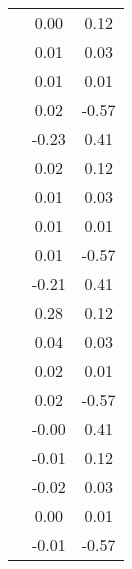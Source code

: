 \begin{table}
\begin{tabular}{c|cc|}
\multicolumn{1}{|c|}{} & \multicolumn{1}{|c|}{      0.00} & \multicolumn{1}{|c|}{      0.12} \\ 
\multicolumn{1}{|c|}{} & \multicolumn{1}{|c|}{      0.01} & \multicolumn{1}{|c|}{      0.03} \\ 
\multicolumn{1}{|c|}{} & \multicolumn{1}{|c|}{      0.01} & \multicolumn{1}{|c|}{      0.01} \\ 
\multicolumn{1}{|c|}{} & \multicolumn{1}{|c|}{      0.02} & \multicolumn{1}{|c|}{     -0.57} \\ 
\multicolumn{1}{|c|}{} & \multicolumn{1}{|c|}{     -0.23} & \multicolumn{1}{|c|}{      0.41} \\ 
\multicolumn{1}{|c|}{} & \multicolumn{1}{|c|}{      0.02} & \multicolumn{1}{|c|}{      0.12} \\ 
\multicolumn{1}{|c|}{} & \multicolumn{1}{|c|}{      0.01} & \multicolumn{1}{|c|}{      0.03} \\ 
\multicolumn{1}{|c|}{} & \multicolumn{1}{|c|}{      0.01} & \multicolumn{1}{|c|}{      0.01} \\ 
\multicolumn{1}{|c|}{} & \multicolumn{1}{|c|}{      0.01} & \multicolumn{1}{|c|}{     -0.57} \\ 
\multicolumn{1}{|c|}{} & \multicolumn{1}{|c|}{     -0.21} & \multicolumn{1}{|c|}{      0.41} \\ 
\multicolumn{1}{|c|}{} & \multicolumn{1}{|c|}{      0.28} & \multicolumn{1}{|c|}{      0.12} \\ 
\multicolumn{1}{|c|}{} & \multicolumn{1}{|c|}{      0.04} & \multicolumn{1}{|c|}{      0.03} \\ 
\multicolumn{1}{|c|}{} & \multicolumn{1}{|c|}{      0.02} & \multicolumn{1}{|c|}{      0.01} \\ 
\multicolumn{1}{|c|}{} & \multicolumn{1}{|c|}{      0.02} & \multicolumn{1}{|c|}{     -0.57} \\ 
\multicolumn{1}{|c|}{} & \multicolumn{1}{|c|}{     -0.00} & \multicolumn{1}{|c|}{      0.41} \\ 
\multicolumn{1}{|c|}{} & \multicolumn{1}{|c|}{     -0.01} & \multicolumn{1}{|c|}{      0.12} \\ 
\multicolumn{1}{|c|}{} & \multicolumn{1}{|c|}{     -0.02} & \multicolumn{1}{|c|}{      0.03} \\ 
\multicolumn{1}{|c|}{} & \multicolumn{1}{|c|}{      0.00} & \multicolumn{1}{|c|}{      0.01} \\ 
\multicolumn{1}{|c|}{} & \multicolumn{1}{|c|}{     -0.01} & \multicolumn{1}{|c|}{     -0.57} \\ 

\end{tabular}
\end{table}
